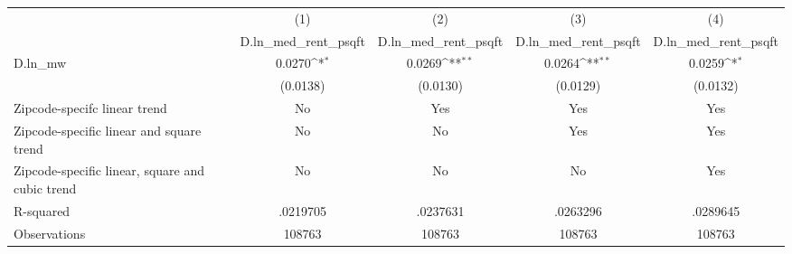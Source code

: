 {
\def\sym#1{\ifmmode^{#1}\else\(^{#1}\)\fi}
\begin{tabular}{l*{4}{c}}
\hline\hline
          &\multicolumn{1}{c}{(1)}&\multicolumn{1}{c}{(2)}&\multicolumn{1}{c}{(3)}&\multicolumn{1}{c}{(4)}\\
          &\multicolumn{1}{c}{D.ln\_med\_rent\_psqft}&\multicolumn{1}{c}{D.ln\_med\_rent\_psqft}&\multicolumn{1}{c}{D.ln\_med\_rent\_psqft}&\multicolumn{1}{c}{D.ln\_med\_rent\_psqft}\\
\hline
D.ln\_mw   &   0.0270\sym{*}  &   0.0269\sym{**} &   0.0264\sym{**} &   0.0259\sym{*}  \\
          & (0.0138)         & (0.0130)         & (0.0129)         & (0.0132)         \\
\hline
Zipcode-specifc linear trend&       No         &      Yes         &      Yes         &      Yes         \\
Zipcode-specific linear and square trend&       No         &       No         &      Yes         &      Yes         \\
Zipcode-specific linear, square and cubic trend&       No         &       No         &       No         &      Yes         \\
R-squared & .0219705         & .0237631         & .0263296         & .0289645         \\
Observations&   108763         &   108763         &   108763         &   108763         \\
\hline\hline
\end{tabular}
}
